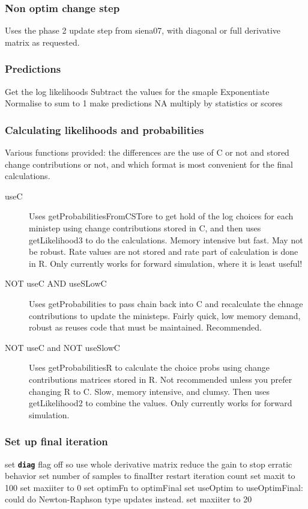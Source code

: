 \documentclass[12pt, a4paper]{article}
\renewcommand{\=}{\,=\,}
\newcommand{\+}{\,+\,}
\newcommand{\sfn}[1]{\textbf{\texttt{#1}}}
\begin{document}
\subsubsection{Non optim change step}
\label{sec:algchange}
\begin{algorithmic}
\STATE Uses the phase 2 update step from siena07, with diagonal or full
derivative matrix as requested.
\end{algorithmic}
\subsubsection{Predictions}
\label{sec:pred}
\begin{algorithmic}
\STATE Get the log likelihoods
\STATE Subtract the values for the smaple
\STATE Exponentiate
\STATE Normalise to sum to 1
\STATE make predictions NA
\ELSE
\STATE multiply by statistics or scores
\ENDIF
\end{algorithmic}
\subsubsection{Calculating likelihoods and probabilities}
Various functions provided: the differences are the use of C or not and stored
change contributions or not, and which format is most convenient for the final
calculations.
\begin{description}
\item[useC] Uses getProbabilitiesFromCSTore to get hold of the log choices for
  each ministep using change contributions stored in C, and then uses
  getLikelihood3 to do the calculations. Memory intensive but fast. May not be
  robust. Rate values are not stored and rate part of calculation is done in
  R. Only currently works for forward simulation, where it is least useful!
\item[NOT useC AND useSLowC] Uses getProbabilities to pass chain back into C and
  recalculate the chnage contributions to update the ministeps. Fairly quick,
  low memory demand, robust as reuses code that must be maintained. Recommended.
\item[NOT useC and NOT useSlowC] Uses getProbabilitiesR to calculate the choice
  probs using change contributions matrices stored in R. Not recommended unless
  you prefer changing R to C. Slow, memory intensive, and clumsy. Then uses
getLikelihood2 to combine the values.  Only currently works for forward
simulation.
\end{description}
\subsubsection{Set up final iteration}
\label{sec:final}
\begin{algorithmic}
\STATE set \sfn{diag} flag off so use whole derivative matrix
\STATE reduce the gain to stop erratic behavior
\STATE set number of samples to finalIter
\STATE restart iteration count
\STATE set maxit to 100
\STATE set maxiiter to 0
\STATE set optimFn to optimFinal
\STATE set useOptim to useOptimFinal: could do Newton-Raphson type updates
instead.
\ELSE
\STATE set maxiiter to 20
\ENDIF
\end{algorithmic}
\end{document}
